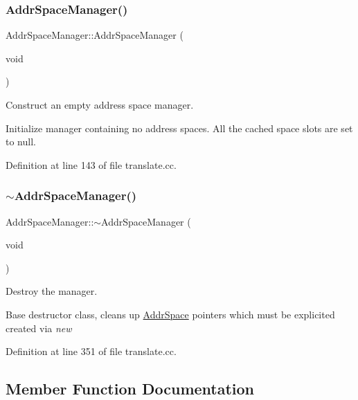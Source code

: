 \subsubsection{\texorpdfstring{AddrSpaceManager()}{AddrSpaceManager()}}
{\footnotesize\ttfamily Addr\+Space\+Manager\+::\+Addr\+Space\+Manager (\begin{DoxyParamCaption}\item[{void}]{ }\end{DoxyParamCaption})}



Construct an empty address space manager. 

Initialize manager containing no address spaces. All the cached space slots are set to null. 

Definition at line 143 of file translate.\+cc.

\mbox{\label{class_addr_space_manager_afca145540a3af8f6d35dfc2037580818}} 
\subsubsection{\texorpdfstring{$\sim$AddrSpaceManager()}{~AddrSpaceManager()}}
{\footnotesize\ttfamily Addr\+Space\+Manager\+::$\sim$\+Addr\+Space\+Manager (\begin{DoxyParamCaption}\item[{void}]{ }\end{DoxyParamCaption})\hspace{0.3cm}{\ttfamily [virtual]}}



Destroy the manager. 

Base destructor class, cleans up \mbox{\hyperlink{class_addr_space}{Addr\+Space}} pointers which must be explicited created via {\itshape new} 

Definition at line 351 of file translate.\+cc.



\subsection{Member Function Documentation}
\mbox{\label{class_addr_space_manager_a6dd0ab3084fd8bb9cb4ea5a84885704d}} 
